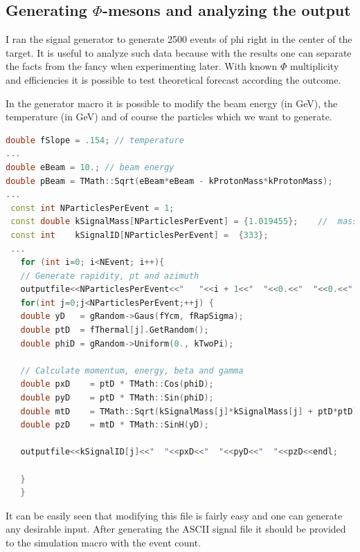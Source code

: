 \documentclass[a4paper,12pt]{article}
\begin{document}
\subsection{ Generating $\Phi$-mesons and analyzing the output}
\vspace{5mm}
\par I ran the signal generator to generate 2500 events of phi right in the center of the target. It is useful to analyze
 such data because with the results one can separate the facts from the fancy when experimenting later. With known $\Phi$ 
 multiplicity and efficiencies it is possible to test theoretical forecast according the outcome.
\par In the generator macro it is possible to modify the beam energy (in GeV), the temperature (in GeV) and of course
 the particles which we want to generate.
\begin{lstlisting}[language=C++]
double fSlope = .154; // temperature
...
double eBeam = 10.; // beam energy
double pBeam = TMath::Sqrt(eBeam*eBeam - kProtonMass*kProtonMass);
...
 const int NParticlesPerEvent = 1;
 const double kSignalMass[NParticlesPerEvent] = {1.019455};    //  mass in GeV
 const int    kSignalID[NParticlesPerEvent] =  {333};
 ...
   for (int i=0; i<NEvent; i++){
   // Generate rapidity, pt and azimuth
   outputfile<<NParticlesPerEvent<<"   "<<i + 1<<"  "<<0.<<"  "<<0.<<"  "<<0.<<endl;
   for(int j=0;j<NParticlesPerEvent;++j) {      
   double yD   = gRandom->Gaus(fYcm, fRapSigma);
   double ptD  = fThermal[j].GetRandom();
   double phiD = gRandom->Uniform(0., kTwoPi);
   
   // Calculate momentum, energy, beta and gamma
   double pxD    = ptD * TMath::Cos(phiD);
   double pyD    = ptD * TMath::Sin(phiD);
   double mtD    = TMath::Sqrt(kSignalMass[j]*kSignalMass[j] + ptD*ptD);
   double pzD    = mtD * TMath::SinH(yD);
   
   outputfile<<kSignalID[j]<<"  "<<pxD<<"  "<<pyD<<"  "<<pzD<<endl;
   
   }
   }
\end{lstlisting}
\par It can be easily seen that modifying this file is fairly easy and one can generate any desirable input. 
After generating the ASCII signal file it should be provided to the simulation macro with the event count.
\end{document}

